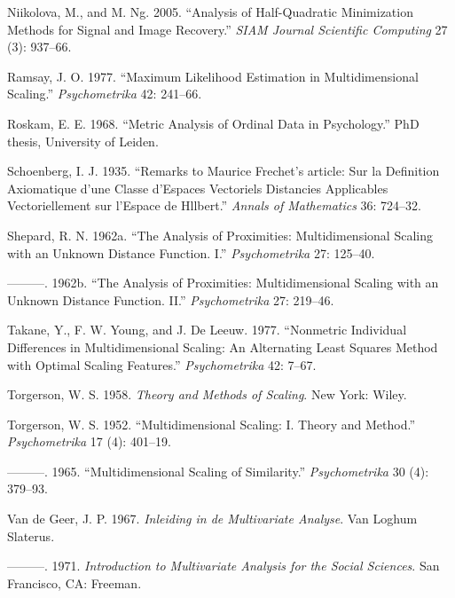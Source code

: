 \documentclass[
  12pt,
  letterpaper,
  DIV=11,
  numbers=noendperiod]{scrartcl}
\newlength{\cslhangindent}
\newenvironment{CSLReferences}[2] %
 {\begin{list}{}{%
  \setlength{\itemindent}{0pt}
  \setlength{\leftmargin}{0pt}
  \setlength{\parsep}{0pt}
  \ifodd #1
   \setlength{\leftmargin}{\cslhangindent}
   \setlength{\itemindent}{-1\cslhangindent}
  \fi
  \setlength{\itemsep}{#2\baselineskip}}}
 {\end{list}}
\begin{document}
\begin{CSLReferences}{1}{0}
Niikolova, M., and M. Ng. 2005. {``Analysis of Half-Quadratic
Minimization Methods for Signal and Image Recovery.''} \emph{SIAM
Journal Scientific Computing} 27 (3): 937--66.

Ramsay, J. O. 1977. {``{Maximum Likelihood Estimation in
Multidimensional Scaling}.''} \emph{Psychometrika} 42: 241--66.

Roskam, E. E. 1968. {``{Metric Analysis of Ordinal Data in
Psychology}.''} PhD thesis, University of Leiden.

Schoenberg, I. J. 1935. {``{Remarks to Maurice Frechet's article: Sur la
Definition Axiomatique d'une Classe d'Espaces Vectoriels Distancies
Applicables Vectoriellement sur l'Espace de Hllbert}.''} \emph{Annals of
Mathematics} 36: 724--32.

Shepard, R. N. 1962a. {``{The Analysis of Proximities: Multidimensional
Scaling with an Unknown Distance Function. I}.''} \emph{Psychometrika}
27: 125--40.

---------. 1962b. {``{The Analysis of Proximities: Multidimensional
Scaling with an Unknown Distance Function. II}.''} \emph{Psychometrika}
27: 219--46.

Takane, Y., F. W. Young, and J. De Leeuw. 1977. {``Nonmetric Individual
Differences in Multidimensional Scaling: An Alternating Least Squares
Method with Optimal Scaling Features.''} \emph{Psychometrika} 42: 7--67.

Torgerson, W. S. 1958. \emph{{Theory and Methods of Scaling}}. New York:
Wiley.

Torgerson, W. S. 1952. {``{Multidimensional Scaling: I. Theory and
Method}.''} \emph{Psychometrika} 17 (4): 401--19.

---------. 1965. {``{Multidimensional Scaling of Similarity}.''}
\emph{Psychometrika} 30 (4): 379--93.

Van de Geer, J. P. 1967. \emph{{Inleiding in de Multivariate Analyse}}.
Van Loghum Slaterus.

---------. 1971. \emph{{Introduction to Multivariate Analysis for the
Social Sciences}}. San Francisco, CA: Freeman.


\end{CSLReferences}
\end{document}
